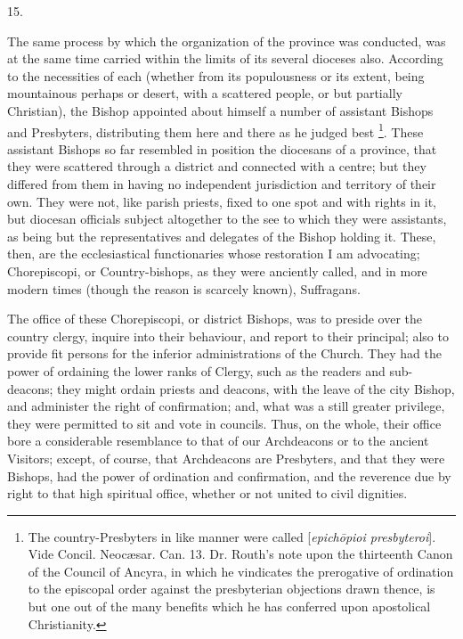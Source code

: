 15.

The same process by which the organization of the
province was conducted, was at the same time carried within the limits
of its several dioceses also. According to the necessities of each
(whether from its populousness or its extent, being mountainous
perhaps or desert, with a scattered people, or but partially
Christian), the Bishop appointed about himself a number of assistant
Bishops and Presbyters, distributing them here and there as he judged best \footnote{The country-Presbyters in like manner were called [\emph{epich\={o}pioi
presbyteroi}]. Vide Concil. Neocæsar. Can. 13. Dr. Routh's note
upon the thirteenth Canon of the Council of Ancyra, in which he
vindicates the prerogative of ordination to the episcopal order
against the presbyterian objections drawn thence, is but one out of
the many benefits which he has conferred upon apostolical
Christianity.}. These
assistant Bishops so far resembled in position the diocesans of a
province, that they were scattered through a district and connected
with a centre; but they differed from them in having no independent
jurisdiction and territory of their own. They were not, like parish
priests, fixed to one spot and with rights in it, but diocesan
officials subject altogether to the see to which they were assistants,
as being but the representatives and delegates of the Bishop holding
it. These, then, are the ecclesiastical functionaries whose
restoration I am advocating; Chorepiscopi, or Country-bishops, as they
were anciently called, and in more modern times (though the reason is
scarcely known), Suffragans.

The office of these Chorepiscopi, or district
Bishops, was to preside over the country clergy, inquire into their
behaviour, and report to their principal; also to provide fit persons
for the inferior administrations of the Church. They had the power of
ordaining the lower ranks of Clergy, such as the readers and
sub-deacons; they might ordain priests and deacons, with the leave of
the city Bishop, and administer the right of confirmation; and, what
was a still greater privilege, they were permitted to sit and vote in
councils. Thus, on the whole, their office bore a considerable
resemblance to that of our Archdeacons or to the ancient Visitors;
except, of course, that Archdeacons are Presbyters, and that they were
Bishops, had the power of ordination and confirmation, and the
reverence due by right to that high spiritual office, whether or not
united to civil dignities.

